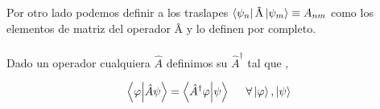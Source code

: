Por otro lado podemos definir a los traslapes $ \bra{\psi_{n}}{\text{\^{A}}}\ket{\psi_{m}}\equiv A_{nm} $ como los elementos de matriz del operador \^{A} y lo definen por completo.\\\\
Dado un operador cualquiera $\hat{A}$ definimos su \emph{} $\hat{A}^{\dagger}$ tal que \cite{peskin_introduction_1995},

\begin{equation*}
    \bra{\varphi}\ket{\hat{A}\psi}=\bra{\hat{A}^{\dagger}\varphi}\ket{\psi} \hspace{0.5cm} \forall \ket{\varphi}, \ket{\psi}  
\end{equation*} 


